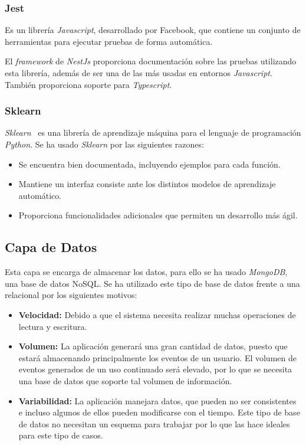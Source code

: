 \subsubsection{Jest~\cite{jest}}

Es un librería \textit{Javascript}, desarrollado por Facebook, que contiene un conjunto de herramientas para ejecutar pruebas de forma automática.

El \textit{framework} de \textit{NestJs} proporciona documentación sobre las pruebas utilizando esta librería, además de ser una de las más usadas en entornos \textit{Javascript}. También proporciona soporte para \textit{Typescript}.

\subsubsection{Sklearn}
\textit{Sklearn}~\cite{sklearn} es una librería de aprendizaje máquina para el lenguaje de programación \textit{Python}.  Se ha usado \textit{Sklearn} por las siguientes razones:
\begin{itemize}
    
\item Se encuentra bien documentada, incluyendo ejemplos para cada función.
\item Mantiene un interfaz consiste ante los distintos modelos de aprendizaje automático.
\item Proporciona funcionalidades adicionales que permiten un desarrollo más ágil.

\end{itemize}

\subsection{Capa de Datos}
Esta capa se encarga de almacenar los datos, para ello se ha usado \textit{MongoDB}, una base de datos NoSQL. Se ha utilizado este tipo de base de datos frente a una relacional por los siguientes motivos:

\begin{itemize}
    \item \textbf{Velocidad:} Debido a que el sistema necesita realizar muchas operaciones de lectura y escritura.
    
    \item \textbf{Volumen:} La aplicación generará una gran cantidad de datos, puesto que estará almacenando principalmente los eventos de un usuario. El volumen de eventos generados de un uso continuado será elevado, por lo que se necesita una base de datos que soporte tal volumen de información.

    \item \textbf{Variabilidad:} La aplicación manejara datos, que pueden no ser consistentes e incluso algunos de ellos pueden modificarse con el tiempo. Este tipo de base de datos no necesitan un esquema para trabajar por lo que las hace ideales para este tipo de casos.

\end{itemize}

